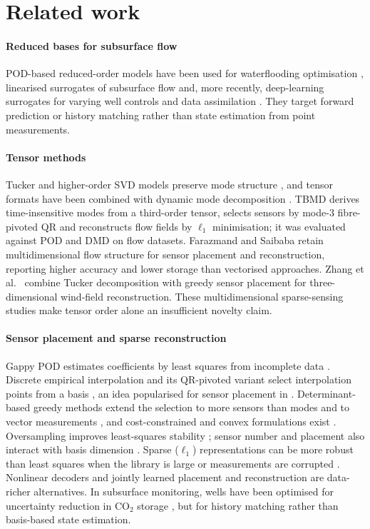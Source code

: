 \section{Related work}
\label{sec:related}
\paragraph{Reduced bases for subsurface flow} POD-based reduced-order models have been used for waterflooding optimisation \cite{vandoren2006,jansen2017rom}, linearised surrogates of subsurface flow \cite{cardoso2010,he2014} and, more recently, deep-learning surrogates for varying well controls and data assimilation \cite{jin2020,tang2020}. They target forward prediction or history matching rather than state estimation from point measurements.

\paragraph{Tensor methods} Tucker and higher-order SVD models preserve mode structure \cite{delathauwer2000,kolda2009}, and tensor formats have been combined with dynamic mode decomposition \cite{klus2018,schmid2010}. TBMD \cite{zhong2024tbmd} derives time-insensitive modes from a third-order tensor, selects sensors by mode-3 fibre-pivoted QR and reconstructs flow fields by $\ell_1$ minimisation; it was evaluated against POD and DMD on flow datasets. Farazmand and Saibaba \cite{farazmand2023} retain multidimensional flow structure for sensor placement and reconstruction, reporting higher accuracy and lower storage than vectorised approaches. Zhang et al.\ \cite{zhang2022wind} combine Tucker decomposition with greedy sensor placement for three-dimensional wind-field reconstruction. These multidimensional sparse-sensing studies make tensor order alone an insufficient novelty claim.

\paragraph{Sensor placement and sparse reconstruction} Gappy POD estimates coefficients by least squares from incomplete data \cite{everson1995,willcox2006}. Discrete empirical interpolation and its QR-pivoted variant select interpolation points from a basis \cite{chaturantabut2010,drmac2016}, an idea popularised for sensor placement in \cite{manohar2018}. Determinant-based greedy methods extend the selection to more sensors than modes and to vector measurements \cite{saito2021,saito2020vector}, and cost-constrained and convex formulations exist \cite{clark2019,joshi2009}. Oversampling improves least-squares stability \cite{peherstorfer2020}; sensor number and placement also interact with basis dimension \cite{jayaraman2019}. Sparse ($\ell_1$) representations can be more robust than least squares when the library is large or measurements are corrupted \cite{donoho2006,callaham2019}. Nonlinear decoders \cite{fukami2021} and jointly learned placement and reconstruction \cite{zou2025prosnet} are data-richer alternatives. In subsurface monitoring, wells have been optimised for uncertainty reduction in CO$_2$ storage \cite{crain2023}, but for history matching rather than basis-based state estimation.

